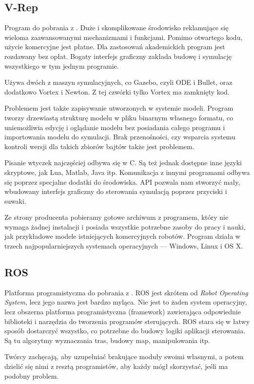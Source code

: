 \subsection{V-Rep}
Program do pobrania z \cite{vrep_website}. Duże i skomplikowane środowisko reklamujące się wieloma zaawansowanymi mechanizmami i funkcjami.
Pomimo otwartego kodu, użycie komercyjne jest płatne. Dla zastosowań akademickich program jest rozdawany bez opłat.
Bogaty interfejs graficzny zakłada budowę i symulację wszystkiego w tym jednym programie.

Używa dwóch z maszyn symulacyjnych, co Gazebo, czyli ODE i Bullet, oraz dodatkowo Vortex i Newton. Z tej czwórki tylko Vortex ma zamknięty kod.

Problemem jest także zapisywanie utworzonych w systemie modeli.
Program tworzy drzewiastą strukturę modelu w pliku binarnym własnego formatu, co uniemożliwia edycję i oglądanie modelu bez posiadania całego programu i importowania modelu do symulacji.
Brak przenośności, czy wsparcia systemu kontroli wersji dla takich zbiorów bajtów także jest problemem.

Pisanie wtyczek najczęściej odbywa się w C. Są też jednak dostępne inne języki skryptowe, jak Lua, Matlab, Java itp.
Komunikacja z innymi programami odbywa się poprzez specjalne dodatki do środowiska.
API pozwala nam stworzyć mały, wbudowany interfejs graficzny do sterowania symulacją poprzez przyciski i suwaki.

Ze strony producenta pobieramy gotowe archiwum z programem, który nie wymaga żadnej instalacji i posiada wszystkie potrzebne zasoby do pracy i nauki, jak przykładowe modele istniejących komercyjnych robotów.
Program działa w trzech najpopularniejszych systemach operacyjnych --- Windows, Linux i OS X.

\subsection{ROS}
Platforma programistyczna do pobrania z \cite{ros_website}.
ROS jest skrótem od \emph{Robot Operating System}, lecz jego nazwa jest bardzo myląca.
Nie jest to żaden system operacyjny, lecz obszerna platforma programistyczna (framework) zawierająca odpowiednie biblioteki i narzędzia do tworzenia programów sterujących.
ROS stara się w łatwy sposób dostarczyć wszystko, co potrzebne do budowy logiki aplikacji sterowania.
Są tu algorytmy wyznaczania tras, budowy map, manipulowania itp. 

Twórcy zachęcają, aby uzupełniać brakujące moduły swoimi własnymi, a potem dzielić się nimi z resztą programistów, aby każdy mógł skorzystać, jeśli ma podobny problem.

